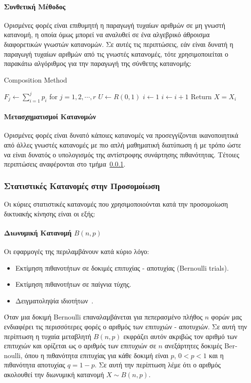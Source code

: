 \documentclass[12pt]{report}
\begin{document}
\paragraph{Συνθετική Μέθοδος}
Ορισμένες φορές είναι επιθυμητή η παραγωγή τυχαίων αριθμών σε μη γνωστή κατανομή, η οποία όμως μπορεί να αναλυθεί σε ένα αλγεβρικό άθροισμα διαφορετικών γνωστών κατανομών. Σε αυτές τις περιπτώσεις, εάν είναι δυνατή η παραγωγή τυχαίων αριθμών από τις γνωστές κατανομές, τότε χρησιμοποιείται ο παρακάτω αλγόριθμος για την παραγωγή της σύνθετης κατανομής:
\begin{algorithm}[H]
\caption{\textlatin{Composition Method}}
\begin{algorithmic}[1]
  \State $F_j \leftarrow \sum_{i=1}^{j}p_i$ for $j=1,2,\cdots,r$
  \State $U \leftarrow R(0,1)$
  \State $i \leftarrow 1$
    \State $i \leftarrow i+1$
  \EndWhile
  \State Return $X=X_i$ 
\end{algorithmic}
\end{algorithm}

\paragraph{Μετασχηματισμοί Κατανομών}
Ορισμένες φορές είναι δυνατό κάποιες κατανομές να προσεγγίζονται ικανοποιητικά από άλλες γνωστές κατανομές με πιο απλή μαθηματική διατύπωση ή με τρόπο ώστε να είναι δυνατός ο υπολογισμός της αντίστροφης συνάρτησης πιθανότητας. Τέτοιες περιπτώσεις αναφέρονται στο τμήμα~\ref{stat_distributions}.

\subsubsection{Στατιστικές Κατανομές στην Προσομοίωση}\label{stat_distributions}
Οι κύριες στατιστικές κατανομές που χρησιμοποιούνται κατά την προσομοίωση δικτυακής κίνησης είναι οι εξής:
\paragraph{Διωνυμική Κατανομή \(B(n, p)\)} Οι εφαρμογές της περιλαμβάνουν κατά κύριο λόγο:
\begin{itemize}
  \item Εκτίμηση πιθανοτήτων σε δοκιμές επιτυχίας - αποτυχίας (\textlatin{Bernoulli trials}).
  \item Εκτίμηση πιθανοτήτων σε παίγνια τύχης.
  \item Δειγματοληψία ιδιοτήτων~\cite{book:07}.
\end{itemize}
Όταν μια δοκιμή \textlatin{Bernoulli} επαναλαμβάνεται για πεπερασμένο πλήθος \(n\) φορών μας ενδιαφέρει τις περισσότερες φορές ο αριθμός των επιτυχιών - αποτυχιών. Σε αυτή την περίπτωση η τυχαία μεταβλητή \(B(n, p)\) εκφράζει αυτόν ακριβώς τον αριθμό των επιτυχιών και ορίζεται ως ο αριθμός των επιτυχιών σε \(n\) ανεξάρτητες δοκιμές \textlatin{Bernoulli}, όπου η πιθανότητα επιτυχίας για κάθε δοκιμή είναι \(p\), \(0<p<1\) και η πιθανότητα αποτυχίας \(q=1-p\). Σε αυτή την περίπτωση λέμε ότι ο αριθμός ακολουθεί την διωνυμική κατανομή \(X \sim B(n, p)\).
\end{document}
